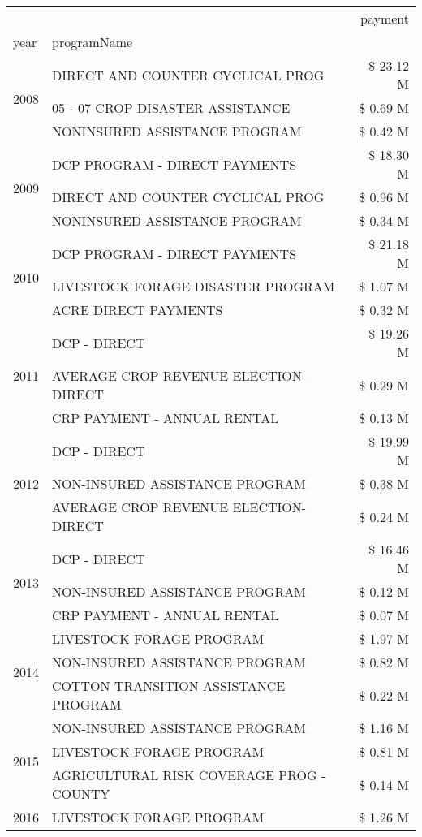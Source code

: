 \begin{tabular}{llr}
\toprule
 &  & payment \\
year & programName &  \\
\midrule
\multirow[t]{3}{*}{2008} & DIRECT AND COUNTER CYCLICAL PROG & \$ 23.12 M \\
 & 05 - 07 CROP DISASTER ASSISTANCE & \$ 0.69 M \\
 & NONINSURED ASSISTANCE PROGRAM & \$ 0.42 M \\
\cline{1-3}
\multirow[t]{3}{*}{2009} & DCP PROGRAM - DIRECT PAYMENTS & \$ 18.30 M \\
 & DIRECT AND COUNTER CYCLICAL PROG & \$ 0.96 M \\
 & NONINSURED ASSISTANCE PROGRAM & \$ 0.34 M \\
\cline{1-3}
\multirow[t]{3}{*}{2010} & DCP PROGRAM - DIRECT PAYMENTS & \$ 21.18 M \\
 & LIVESTOCK FORAGE DISASTER  PROGRAM & \$ 1.07 M \\
 & ACRE DIRECT PAYMENTS & \$ 0.32 M \\
\cline{1-3}
\multirow[t]{3}{*}{2011} & DCP - DIRECT & \$ 19.26 M \\
 & AVERAGE CROP REVENUE ELECTION-DIRECT & \$ 0.29 M \\
 & CRP PAYMENT - ANNUAL RENTAL & \$ 0.13 M \\
\cline{1-3}
\multirow[t]{3}{*}{2012} & DCP - DIRECT & \$ 19.99 M \\
 & NON-INSURED ASSISTANCE PROGRAM & \$ 0.38 M \\
 & AVERAGE CROP REVENUE ELECTION-DIRECT & \$ 0.24 M \\
\cline{1-3}
\multirow[t]{3}{*}{2013} & DCP - DIRECT & \$ 16.46 M \\
 & NON-INSURED ASSISTANCE PROGRAM & \$ 0.12 M \\
 & CRP PAYMENT - ANNUAL RENTAL & \$ 0.07 M \\
\cline{1-3}
\multirow[t]{3}{*}{2014} & LIVESTOCK FORAGE PROGRAM & \$ 1.97 M \\
 & NON-INSURED ASSISTANCE PROGRAM & \$ 0.82 M \\
 & COTTON TRANSITION ASSISTANCE PROGRAM & \$ 0.22 M \\
\cline{1-3}
\multirow[t]{3}{*}{2015} & NON-INSURED ASSISTANCE PROGRAM & \$ 1.16 M \\
 & LIVESTOCK FORAGE PROGRAM & \$ 0.81 M \\
 & AGRICULTURAL RISK COVERAGE PROG - COUNTY & \$ 0.14 M \\
\cline{1-3}
\multirow[t]{3}{*}{2016} & LIVESTOCK FORAGE PROGRAM                      & \$ 1.26 M \\

\end{tabular}
